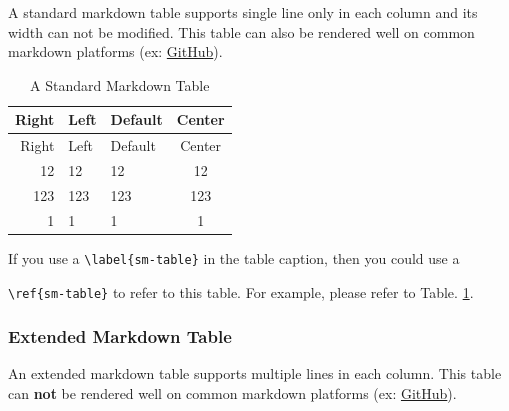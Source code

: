 \documentclass[10pt, a4paper, oneside]{article}
\begin{document}
A standard markdown table supports single line only in each column and its width can not be modified.
This table can also be rendered well on common markdown platforms (ex: \href{https://github.com/}{GitHub}).

\begin{longtable}[c]{@{}rllc@{}}
\caption{A Standard Markdown Table \label{sm-table}}\tabularnewline
\toprule
Right & Left & Default & Center\tabularnewline
\midrule
\endfirsthead
\toprule
Right & Left & Default & Center\tabularnewline
\midrule
\endhead
12 & 12 & 12 & 12\tabularnewline
123 & 123 & 123 & 123\tabularnewline
1 & 1 & 1 & 1\tabularnewline
\bottomrule
\end{longtable}

If you use a \texttt{\textbackslash{}label\{sm-table\}} in the table caption, then you could use a

\texttt{\textbackslash{}ref\{sm-table\}} to refer to this table.
For example, please refer to Table. \ref{sm-table}.

\subsubsection{Extended Markdown Table}\label{extended-markdown-table}

An extended markdown table supports multiple lines in each column.
This table can \textbf{not} be rendered well on common markdown platforms (ex: \href{https://github.com/}{GitHub}).
\end{document}
